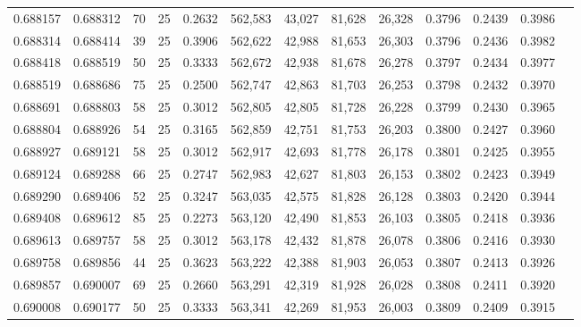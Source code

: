 \begin{tabular}{rrrrrrrrrrrrr}
0.688157 & 0.688312 &    70 &  25 &                                     0.2632 & 562,583 &  43,027 &  81,628 &  26,328 & 0.3796 & 0.2439 & 0.3986 \\
0.688314 & 0.688414 &    39 &  25 &                                     0.3906 & 562,622 &  42,988 &  81,653 &  26,303 & 0.3796 & 0.2436 & 0.3982 \\
0.688418 & 0.688519 &    50 &  25 &                                     0.3333 & 562,672 &  42,938 &  81,678 &  26,278 & 0.3797 & 0.2434 & 0.3977 \\
0.688519 & 0.688686 &    75 &  25 &                                     0.2500 & 562,747 &  42,863 &  81,703 &  26,253 & 0.3798 & 0.2432 & 0.3970 \\
0.688691 & 0.688803 &    58 &  25 &                                     0.3012 & 562,805 &  42,805 &  81,728 &  26,228 & 0.3799 & 0.2430 & 0.3965 \\
0.688804 & 0.688926 &    54 &  25 &                                     0.3165 & 562,859 &  42,751 &  81,753 &  26,203 & 0.3800 & 0.2427 & 0.3960 \\
0.688927 & 0.689121 &    58 &  25 &                                     0.3012 & 562,917 &  42,693 &  81,778 &  26,178 & 0.3801 & 0.2425 & 0.3955 \\
0.689124 & 0.689288 &    66 &  25 &                                     0.2747 & 562,983 &  42,627 &  81,803 &  26,153 & 0.3802 & 0.2423 & 0.3949 \\
0.689290 & 0.689406 &    52 &  25 &                                     0.3247 & 563,035 &  42,575 &  81,828 &  26,128 & 0.3803 & 0.2420 & 0.3944 \\
0.689408 & 0.689612 &    85 &  25 &                                     0.2273 & 563,120 &  42,490 &  81,853 &  26,103 & 0.3805 & 0.2418 & 0.3936 \\
0.689613 & 0.689757 &    58 &  25 &                                     0.3012 & 563,178 &  42,432 &  81,878 &  26,078 & 0.3806 & 0.2416 & 0.3930 \\
0.689758 & 0.689856 &    44 &  25 &                                     0.3623 & 563,222 &  42,388 &  81,903 &  26,053 & 0.3807 & 0.2413 & 0.3926 \\
0.689857 & 0.690007 &    69 &  25 &                                     0.2660 & 563,291 &  42,319 &  81,928 &  26,028 & 0.3808 & 0.2411 & 0.3920 \\
0.690008 & 0.690177 &    50 &  25 &                                     0.3333 & 563,341 &  42,269 &  81,953 &  26,003 & 0.3809 & 0.2409 & 0.3915 \\

\end{tabular}
